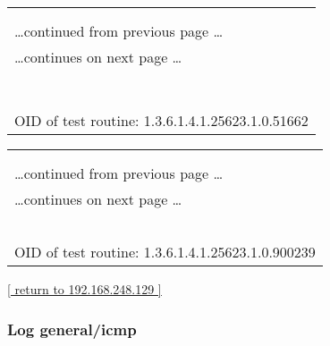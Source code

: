 \documentclass{article}
\begin{document}
\begin{longtable}{|p{}|}
\hline
\rowcolor{openvas_log}{\color{white}{Log (CVSS: 0.0) }}\\
\rowcolor{openvas_log}{\color{white}{NVT: Traceroute}}\\
\hline
\endfirsthead
\hfill\ldots continued from previous page \ldots \\
\hline
\endhead
\hline
\ldots continues on next page \ldots \\
\endfoot
\hline
\endlastfoot
\\
\rowcolor{white}{\verb=Here is the route from 192.168.248.132 to 192.168.248.129:=}\\
\rowcolor{white}{\verb=192.168.248.132=}\\
\rowcolor{white}{\verb=192.168.248.129=}\\
\rowcolor{white}{\verb==}\\
\rowcolor{white}{\verb==}\\
\\
OID of test routine: 1.3.6.1.4.1.25623.1.0.51662\\
\end{longtable}

\begin{longtable}{|p{}|}
\hline
\rowcolor{openvas_log}{\color{white}{Log (CVSS: 0.0) }}\\
\rowcolor{openvas_log}{\color{white}{NVT: Checks for open tcp ports}}\\
\hline
\endfirsthead
\hfill\ldots continued from previous page \ldots \\
\hline
\endhead
\hline
\ldots continues on next page \ldots \\
\endfoot
\hline
\endlastfoot
\\
\rowcolor{white}{\verb=Open TCP ports: 23, 80=}\\
\rowcolor{white}{\verb==}\\
\rowcolor{white}{\verb==}\\
\\
OID of test routine: 1.3.6.1.4.1.25623.1.0.900239\\
\end{longtable}

\begin{footnotesize}\hyperref[host:192.168.248.129]{[ return to 192.168.248.129 ]}\end{footnotesize}
\subsubsection{Log general/icmp}
\label{port:192.168.248.129 general/icmp Log}
\end{document}
